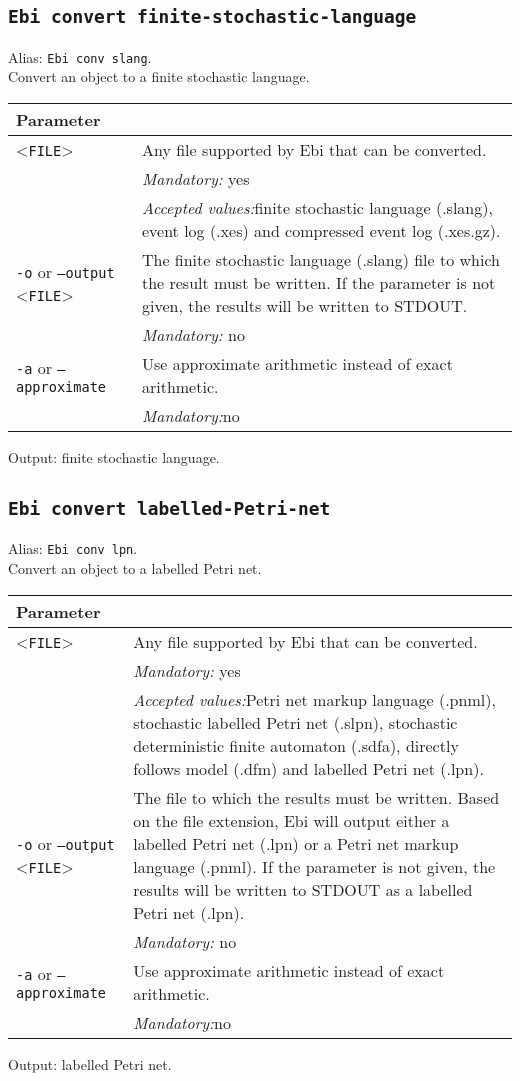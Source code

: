 {\subsection{\texttt{Ebi convert finite-stochastic-language}}
Alias: \texttt{Ebi conv slang}.\\
Convert an object to a finite stochastic language.\\
\begin{tabularx}{\linewidth}{lX}
\toprule
Parameter \\\midrule
<\texttt{FILE}>&Any file supported by Ebi that can be converted.\\
&\textit{Mandatory:} \quad yes\\
&\textit{Accepted values:}\quad finite stochastic language (.slang), event log (.xes) and compressed event log (.xes.gz).\\
\texttt{-o} or \texttt{--output} <\texttt{FILE}> &
The finite stochastic language (.slang) file to which the result must be written. If the parameter is not given, the results will be written to STDOUT.\\
&\textit{Mandatory:} \quad no\\
\texttt{-a} or \texttt{--approximate} & Use approximate arithmetic instead of exact arithmetic.\\
&\textit{Mandatory:}\quad no\\
\bottomrule
\end{tabularx}
Output: finite stochastic language.
\subsection{\texttt{Ebi convert labelled-Petri-net}}
Alias: \texttt{Ebi conv lpn}.\\
Convert an object to a labelled Petri net.\\
\begin{tabularx}{\linewidth}{lX}
\toprule
Parameter \\\midrule
<\texttt{FILE}>&Any file supported by Ebi that can be converted.\\
&\textit{Mandatory:} \quad yes\\
&\textit{Accepted values:}\quad Petri net markup language (.pnml), stochastic labelled Petri net (.slpn), stochastic deterministic finite automaton (.sdfa), directly follows model (.dfm) and labelled Petri net (.lpn).\\
\texttt{-o} or \texttt{--output} <\texttt{FILE}> &
The file to which the results must be written. Based on the file extension, Ebi will output either a labelled Petri net (.lpn) or a Petri net markup language (.pnml).
If the parameter is not given, the results will be written to STDOUT as a labelled Petri net (.lpn).\\
&\textit{Mandatory:} \quad no\\
\texttt{-a} or \texttt{--approximate} & Use approximate arithmetic instead of exact arithmetic.\\
&\textit{Mandatory:}\quad no\\
\bottomrule
\end{tabularx}
Output: labelled Petri net.
}
